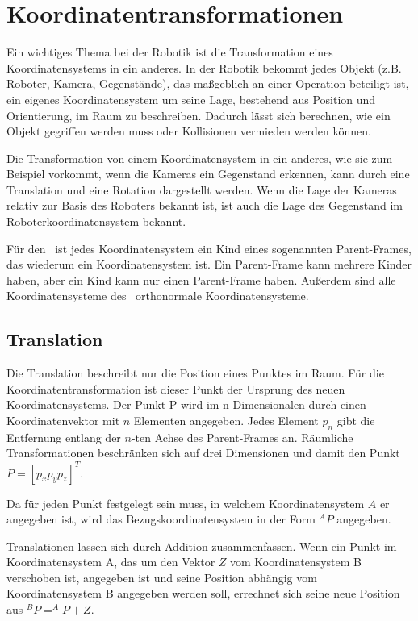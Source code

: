 \section{Koordinatentransformationen}

Ein wichtiges Thema bei der Robotik ist die Transformation eines 
Koordinatensystems in ein anderes. In der Robotik bekommt jedes
Objekt (z.B. Roboter, Kamera, Gegenstände), das maßgeblich an einer Operation beteiligt ist, ein eigenes
Koordinatensystem um seine Lage, bestehend aus Position und Orientierung,
im Raum zu beschreiben. Dadurch lässt sich berechnen, wie ein Objekt gegriffen
werden muss oder Kollisionen vermieden werden können.

Die Transformation von einem 
Koordinatensystem in ein anderes, wie sie zum Beispiel vorkommt, wenn die 
Kameras ein Gegenstand erkennen, kann
durch eine Translation und eine Rotation dargestellt werden. Wenn die Lage der
Kameras relativ zur Basis des Roboters bekannt ist, ist
auch die Lage des Gegenstand im Roboterkoordinatensystem bekannt.

Für den \cob\ ist 
jedes Koordinatensystem ein Kind eines sogenannten Parent-Frames, das wiederum 
ein Koordinatensystem ist. Ein Parent-Frame kann mehrere Kinder haben, aber ein
Kind kann nur einen Parent-Frame haben. Außerdem sind alle Koordinatensysteme
des \cob\ orthonormale Koordinatensysteme. 

\subsection{Translation}
\label{sub:Translation}


Die Translation beschreibt nur die Position eines Punktes im Raum. Für die 
Koordinatentransformation ist dieser Punkt der Ursprung des neuen Koordinatensystems.
Der Punkt P wird im n-Dimensionalen durch einen Koordinatenvektor mit $n$ 
Elementen angegeben. Jedes Element $p_n$ gibt die Entfernung
entlang der $n$-ten Achse des Parent-Frames an. Räumliche Transformationen beschränken sich auf drei Dimensionen
und damit den Punkt $P= [p_x p_y p_z]^T$.

Da für jeden Punkt festgelegt sein muss, in welchem Koordinatensystem $A$ er angegeben
ist, wird das Bezugskoordinatensystem in der Form $^AP$ angegeben.

Translationen lassen sich durch Addition zusammenfassen. Wenn ein Punkt im 
Koordinatensystem A, das um den Vektor $Z$ vom Koordinatensystem B verschoben ist,
angegeben
ist und seine Position abhängig vom Koordinatensystem B angegeben werden soll,
errechnet sich seine neue Position aus $^BP = ^AP + Z$.


